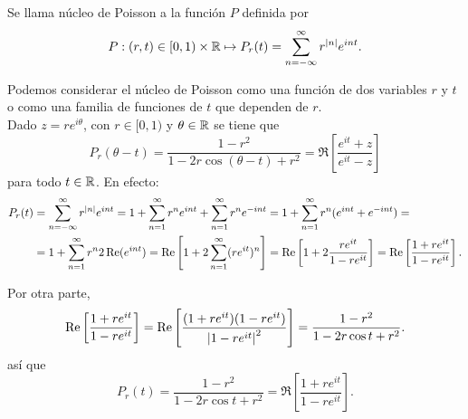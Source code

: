 \begin{definition}
    Se llama núcleo de Poisson a la función $P$ definida por
    \begin{equation}
        \label{eq:poisson1}
        P:(r,t) \in [0,1)\times \mathbb{R} \mapsto P_r(t) = \sum_{n=-\infty}^{\infty} r^{\left\lvert n\right\rvert}e^{int}.
    \end{equation}

    Podemos considerar el núcleo de Poisson como una función de dos variables $r$ y $t$ o como una familia de funciones de $t$ que dependen de $r$. \\

    Dado $z = re^{i \theta}$, con $r \in [0,1)$ y $\theta \in \mathbb{R}$ se tiene que
    \begin{equation}
        \label{eq:poisson2}
        P_r(\theta - t) =  \dfrac{1 - r^2}{1 - 2r \cos (\theta - t) + r^2} = \Re \left[ \dfrac{e^{it} + z}{e^{it} - z} \right]
    \end{equation}
    para todo $t \in \mathbb{R}$. En efecto:
    \begin{equation*}
        \begin{split}
            P_r(t) & = \sum_{n=-\infty}^{\infty} r^{\left\lvert n\right\rvert}e^{int} = 1 + \sum_{n=1}^{\infty} r^n e^{int} + \sum_{n=1}^{\infty} r^n e^{-int} = 1 + \sum_{n=1}^{\infty} r^n (e^{int} + e^{-int}) = \\
                   & =  1 + \sum_{n=1}^{\infty} r^n 2 \operatorname{Re}(e^{int}) = \operatorname{Re} \left[ 1 + 2 \sum_{n=1}^{\infty} (r e^{it})^n  \right] = \operatorname{Re} \left[ 1 + 2 \dfrac{re^{it}}{1-re^{it}} \right] = \operatorname{Re} \left[\dfrac{1 + re^{it}}{1-re^{it}} \right].
        \end{split}
    \end{equation*}

    Por otra parte,
    \begin{equation}
        \label{eq:poisson3}
        \operatorname{Re} \left[ \dfrac{1 + re^{it}}{1-re^{it}} \right] = \operatorname{Re} \left[ \dfrac{(1 + re^{it})(1 - re^{it})}{\left\lvert1-re^{it}\right\rvert^2} \right] = \dfrac{1 - r^2}{1 - 2r \cos t + r^2}.
    \end{equation}
    así que
    \begin{equation}
        \label{eq:poisson4}
        P_r(t) =  \dfrac{1 - r^2}{1 - 2r \cos t + r^2} = \Re \left[ \dfrac{1 + re^{it}}{1 - re^{it}} \right]. %
    \end{equation}
\end{definition}
\medskip


